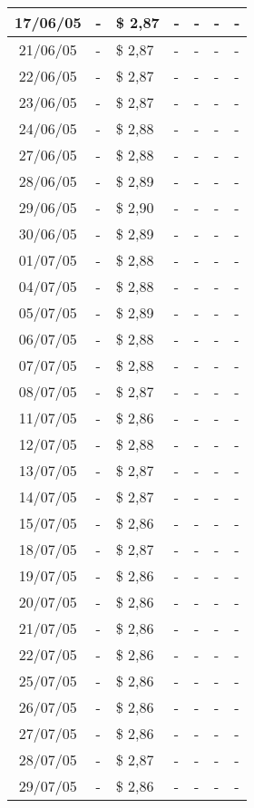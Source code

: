 \begin{center}
\begin{longtable}{|c|p{1.5cm}|p{1.5cm}|p{1.5cm}|p{1.5cm}|p{1.5cm}|p{1.5cm}|}
17/06/05 & - & \$ 2,87 & - & - & - & - \\ \hline
21/06/05 & - & \$ 2,87 & - & - & - & - \\ \hline
22/06/05 & - & \$ 2,87 & - & - & - & - \\ \hline
23/06/05 & - & \$ 2,87 & - & - & - & - \\ \hline
24/06/05 & - & \$ 2,88 & - & - & - & - \\ \hline
27/06/05 & - & \$ 2,88 & - & - & - & - \\ \hline
28/06/05 & - & \$ 2,89 & - & - & - & - \\ \hline
29/06/05 & - & \$ 2,90 & - & - & - & - \\ \hline
30/06/05 & - & \$ 2,89 & - & - & - & - \\ \hline
01/07/05 & - & \$ 2,88 & - & - & - & - \\ \hline
04/07/05 & - & \$ 2,88 & - & - & - & - \\ \hline
05/07/05 & - & \$ 2,89 & - & - & - & - \\ \hline
06/07/05 & - & \$ 2,88 & - & - & - & - \\ \hline
07/07/05 & - & \$ 2,88 & - & - & - & - \\ \hline
08/07/05 & - & \$ 2,87 & - & - & - & - \\ \hline
11/07/05 & - & \$ 2,86 & - & - & - & - \\ \hline
12/07/05 & - & \$ 2,88 & - & - & - & - \\ \hline
13/07/05 & - & \$ 2,87 & - & - & - & - \\ \hline
14/07/05 & - & \$ 2,87 & - & - & - & - \\ \hline
15/07/05 & - & \$ 2,86 & - & - & - & - \\ \hline
18/07/05 & - & \$ 2,87 & - & - & - & - \\ \hline
19/07/05 & - & \$ 2,86 & - & - & - & - \\ \hline
20/07/05 & - & \$ 2,86 & - & - & - & - \\ \hline
21/07/05 & - & \$ 2,86 & - & - & - & - \\ \hline
22/07/05 & - & \$ 2,86 & - & - & - & - \\ \hline
25/07/05 & - & \$ 2,86 & - & - & - & - \\ \hline
26/07/05 & - & \$ 2,86 & - & - & - & - \\ \hline
27/07/05 & - & \$ 2,86 & - & - & - & - \\ \hline
28/07/05 & - & \$ 2,87 & - & - & - & - \\ \hline
29/07/05 & - & \$ 2,86 & - & - & - & - \\ \hline

\end{longtable}
\end{center}
